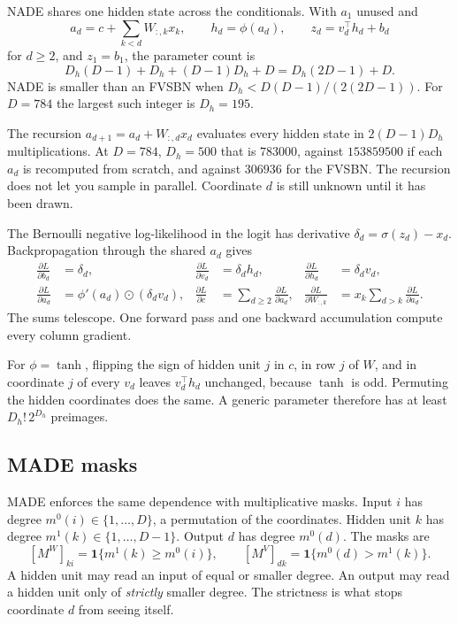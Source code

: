 \documentclass[11pt]{article}
\theoremstyle{remark}
\begin{document}
NADE shares one hidden state across the conditionals. With \(a_1\) unused and
\[
a_d=c+\sum_{k<d}W_{:,k}x_k,\qquad h_d=\phi(a_d),\qquad z_d=v_d^\top h_d+b_d
\]
for \(d\ge 2\), and \(z_1=b_1\), the parameter count is
\[
D_h(D-1)+D_h+(D-1)D_h+D=D_h(2D-1)+D.
\]
NADE is smaller than an FVSBN when \(D_h<D(D-1)/(2(2D-1))\). For \(D=784\) the largest such integer is \(D_h=195\).

The recursion \(a_{d+1}=a_d+W_{:,d}x_d\) evaluates every hidden state in \(2(D-1)D_h\) multiplications. At \(D=784\), \(D_h=500\) that is \(783000\), against \(153859500\) if each \(a_d\) is recomputed from scratch, and against \(306936\) for the FVSBN. The recursion does not let you sample in parallel. Coordinate \(d\) is still unknown until it has been drawn.

The Bernoulli negative log-likelihood in the logit has derivative \(\delta_d=\sigma(z_d)-x_d\). Backpropagation through the shared \(a_d\) gives
\begin{align*}
\frac{\partial L}{\partial b_d}&=\delta_d, &
\frac{\partial L}{\partial v_d}&=\delta_d h_d, &
\frac{\partial L}{\partial h_d}&=\delta_d v_d,\\
\frac{\partial L}{\partial a_d}&=\phi'(a_d)\odot(\delta_d v_d), &
\frac{\partial L}{\partial c}&=\sum_{d\ge 2}\frac{\partial L}{\partial a_d}, &
\frac{\partial L}{\partial W_{:,k}}&=x_k\sum_{d>k}\frac{\partial L}{\partial a_d}.
\end{align*}
The sums telescope. One forward pass and one backward accumulation compute every column gradient.

For \(\phi=\tanh\), flipping the sign of hidden unit \(j\) in \(c\), in row \(j\) of \(W\), and in coordinate \(j\) of every \(v_d\) leaves \(v_d^\top h_d\) unchanged, because \(\tanh\) is odd. Permuting the hidden coordinates does the same. A generic parameter therefore has at least \(D_h!\,2^{D_h}\) preimages.

\subsection{MADE masks}

MADE enforces the same dependence with multiplicative masks. Input \(i\) has degree \(m^0(i)\in\{1,\ldots,D\}\), a permutation of the coordinates. Hidden unit \(k\) has degree \(m^1(k)\in\{1,\ldots,D-1\}\). Output \(d\) has degree \(m^0(d)\). The masks are
\[
[M^W]_{ki}=\mathbf{1}\{m^1(k)\ge m^0(i)\},\qquad
[M^V]_{dk}=\mathbf{1}\{m^0(d)>m^1(k)\}.
\]
A hidden unit may read an input of equal or smaller degree. An output may read a hidden unit only of \emph{strictly} smaller degree. The strictness is what stops coordinate \(d\) from seeing itself.
\end{document}
